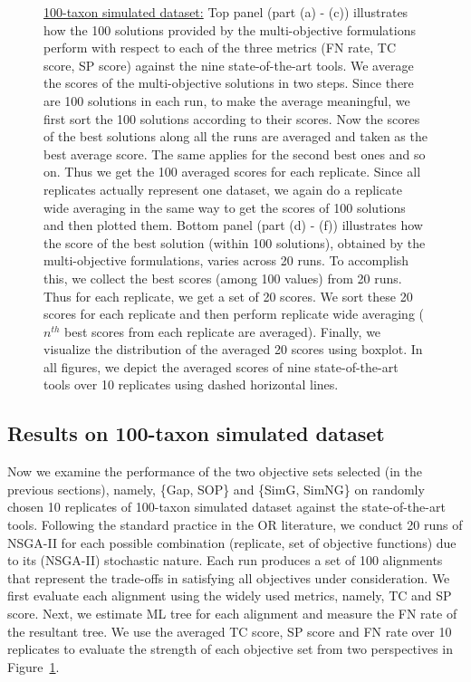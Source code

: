 \begin{figure}[!htbp]
\begin{adjustwidth}{-1.5cm}{-1.5cm}
	\caption{\underline{100-taxon simulated dataset:} Top panel (part (a) - (c)) illustrates how the 100 solutions provided by the multi-objective formulations perform with respect to each of the three metrics (FN rate, TC score, SP score) against the nine state-of-the-art tools. We average the scores of the multi-objective solutions in two steps. Since there are 100 solutions in each run, to make the average meaningful, we first sort the 100 solutions according to their scores. Now the scores of the best solutions along all the runs are averaged and taken as the best average score. The same applies for the second best ones and so on. Thus we get the 100 averaged scores for each replicate. Since all replicates actually represent one dataset, we again do a replicate wide averaging in the same way to get the scores of 100 solutions and then plotted them. Bottom panel (part (d) - (f)) illustrates how the score of the best solution (within 100 solutions), obtained by the multi-objective formulations, varies across 20 runs. To accomplish this, we collect the best scores (among 100 values) from 20 runs. Thus for each replicate, we get a set of 20 scores. We sort these 20 scores for each replicate and then perform replicate wide averaging ($n^{th}$ best scores from each replicate are averaged). Finally, we visualize the distribution of the averaged 20 scores using boxplot. In all figures, we depict the averaged scores of nine state-of-the-art tools over 10 replicates using dashed horizontal lines.}
	\label{fig:perf_100_taxon}
	\end{adjustwidth}
\end{figure}


\subsection{Results on 100-taxon simulated dataset}
\label{sec:result_100_taxon}
Now we examine the performance of the two objective sets selected (in the previous sections), namely, \{Gap, SOP\} and \{SimG, SimNG\} on randomly chosen 10 replicates of 100-taxon simulated dataset against the state-of-the-art tools. Following the standard practice in the OR literature, we conduct 20 runs of NSGA-II for each possible combination (replicate, set of objective functions) due to its (NSGA-II) stochastic nature. Each run produces a set of 100 alignments that represent the trade-offs in satisfying all objectives under consideration. We first evaluate each alignment using the widely used metrics, namely, TC and SP score. Next, we estimate ML tree for each alignment and measure the FN rate of the resultant tree. We use the averaged TC score, SP score and FN rate over 10 replicates to evaluate the strength of each objective set from two perspectives in Figure~\ref{fig:perf_100_taxon}. %


